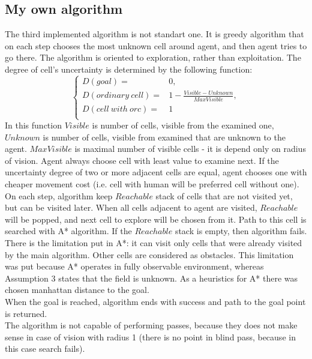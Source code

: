 \documentclass[a4paper,12pt]{article}
\begin{document}
    \subsection{My own algorithm}
    The third implemented algorithm is not standart one. It is greedy algorithm 
    that on each step chooses the most unknown cell around agent, and then agent
    tries to go there. The algorithm is oriented to exploration, rather than 
    exploitation. The degree of cell's uncertainty is determined by the following
    function:\\ 
    $$\begin{cases}
        D(goal)=&0,\\
        D(ordinary\ cell) =& 1 - \frac{Visible-Unknown}{MaxVisible},\\
        D(cell\ with\ orc) =& 1\\
    \end{cases}$$
    In this function $Visible$ is number of cells, visible from the examined 
    one, $Unknown$ is number of cells, visible from examined that are unknown to
    the agent. $MaxVisible$ is maximal number of visible cells - it is depend 
    only on radius of vision. Agent always choose cell with least value to 
    examine next.  If the uncertainty degree of two or more adjacent cells are 
    equal, agent chooses one with cheaper movement cost (i.e. cell with human 
    will be preferred cell without one).\\
    On each step, algorithm keep $Reachable$ stack of cells that are not visited
    yet, but can be visited later. When all cells adjacent to agent are visited,
    $Reachable$ will be popped, and next cell to explore will be chosen from it.
    Path to this cell is searched with A* algorithm. If the $Reachable$ stack is
    empty, then algorithm fails.\\ 
    There is the limitation put in A*: it can visit only cells that were already 
    visited by the main algorithm. Other cells are considered as obstacles. 
    This limitation was put because A* operates in fully observable environment,
    whereas Assumption 3 states that the field is unknown. As a heuristics for 
    A* there was chosen manhattan distance to the goal.\\
    When the goal is reached, algorithm ends with success and path to the goal 
    point is returned.\\
    The algorithm is not capable of performing passes, because they does not make 
    sense in case of vision with radius 1 (there is no point in blind pass, because
    in this case search fails).\\
\end{document}
